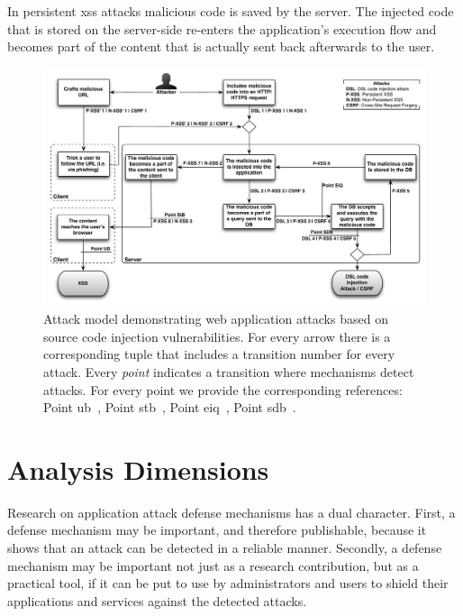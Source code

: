 \documentclass[conference]{IEEEtran}
\begin{document}
In persistent {\sc xss} attacks malicious code is saved by the server.
The injected code that is stored on the server-side re-enters the
application's execution flow and becomes part of the content that is
actually sent back afterwards to the user.

\begin{figure}
\begin{center}
\leavevmode
\includegraphics[scale=0.61]{attacks-steps.pdf}
\end{center}
\caption{\label{fig:attacks}Attack model demonstrating web
application attacks based on source
code injection vulnerabilities. For every arrow there is a
corresponding tuple that includes a transition number for
every attack. Every {\it point} indicates a transition where mechanisms
detect attacks. For every point we provide the corresponding
references:
Point {\sc ub}~\cite{KJKV09,TNH07,NSS06,APKLM10,SPPGMMB04,ML10,YCIS07,PSC09,VDDPJ11,OWVS08,DDHPJ10,GC09,VFJKKV07,SLMS14,BV08},
Point {\sc s}t{\sc b}~\cite{RDWDE07,JKK06a,JB07,NLC07,WPLKK09,JEP08},
Point {\sc e}i{\sc q}~\cite{BWS05,SW06,PS11,HCF05,XBS06,PB05,PMP11,MS09,HO05,SMS13},
Point {\sc sdb}~\cite{BK04,LLW02,VMV05}.}
\end{figure}

\section{Analysis Dimensions}
\label{sec:dimensions}

Research on application attack defense mechanisms has a dual
character. First, a defense mechanism may be important, and therefore
publishable, because it shows that an attack can be detected in a
reliable manner. Secondly, a defense mechanism may be important not
just as a research contribution, but as a practical tool, if it can be
put to use by administrators and users to shield their applications
and services against the detected attacks.
\end{document}
